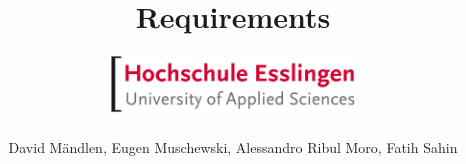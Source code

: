 
\subject{Project MRS}
\title{Requirements}
\author{\includegraphics[width=6.5cm]{images/logo}\\ \\  David Mändlen, Eugen Muschewski, Alessandro Ribul Moro, Fatih Sahin}
\date{\isodate{\today}}
\maketitle



